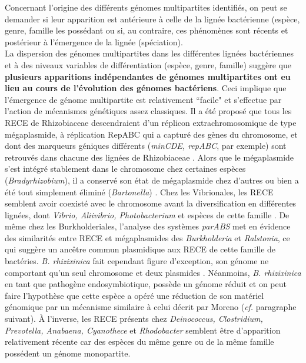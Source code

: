 	Concernant l'origine des différents génomes multipartites identifiés, on peut se demander si leur apparition est antérieure à celle de la lignée bactérienne (espèce, genre, famille les possédant ou si, au contraire, ces phénomènes sont récents et postérieur à l'émergence de la lignée (spéciation).\\ 
	La dispersion des génomes multipartites dans les différentes lignées bactériennes et à des niveaux variables de différentiation (espèce, genre, famille) suggère que \textbf{plusieurs apparitions indépendantes de génomes multipartites ont eu lieu au cours de l'évolution des génomes bactériens}. Ceci implique que l'émergence de génome multipartite est relativement ``facile" et s'effectue par l'action de mécanismes génétiques assez classiques. Il a été proposé que tous les RECE de Rhizobiaceae descendraient d'un réplicon extrachromosomique de type mégaplasmide, à réplication RepABC qui a capturé des gènes du chromosome, et dont des marqueurs géniques différents (\textit{minCDE, repABC}, par exemple) sont retrouvés dans chacune des lignées de Rhizobiaceae  \citep{Slater2009}. Alors que le mégaplasmide s'est intégré stablement dans le chromosome chez certaines espèces (\textit{Bradyrhizobium}), il a conservé son état de mégaplasmide chez d'autres ou bien a été tout simplement éliminé (\textit{Bartonella}) \citep{Slater2009}. Chez les  Vibrionales, les RECE semblent avoir coexisté avec le chromosome avant la diversification en différentes lignées, dont \textit{Vibrio, Aliivibrio, Photobacterium} et espèces de cette famille \citep{Thompson2004}. De même chez les Burkholderiales, l'analyse des systèmes \textit{parABS} \citep{Passot2012} met en évidence des similarités entre RECE et mégaplasmides des \textit{Burkholderia} et \textit{Ralstonia}, ce qui suggère un ancêtre commun plasmidique aux RECE de cette famille de bactéries. \textit{B. rhizixinica} fait cependant figure d'exception, son génome ne comportant qu'un seul chromosome et deux plasmides \citep{lackner2011complete}. Néanmoins, \textit{B. rhizixinica} en tant que pathogène endosymbiotique, possède un génome réduit et on peut faire l'hypothèse que cette espèce a opéré une réduction de son matériel génomique par un mécanisme similaire à celui décrit par Moreno \citep{Moreno1998} (\textit{cf.} paragraphe suivant). À l'inverse, les RECE présents chez \textit{Deinococcus, Clostridium, Prevotella, Anabaena, Cyanothece} et \textit{Rhodobacter} semblent être d'apparition relativement récente car des espèces du même genre ou de la même famille possédent un génome monopartite.

